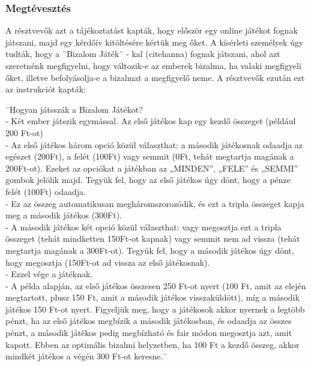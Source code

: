 \subsubsection{Megtévesztés}
A résztvevők azt a tájékoztatást kapták, hogy először egy online játékot fognak játszani, majd egy kérdőív kitöltésére kértük meg őket. A kísérleti személyek úgy tudták, hogy a ¨Bizalom Játék¨ - kal (citehanna) fognak játszani, ahol azt szeretnénk megfigyelni, hogy változik-e az emberek bizalma, ha valaki megfigyeli őket, illetve befolyásolja-e a bizalmat a megfigyelő neme. A résztvevők ezután ezt az instrukciót kapták:
\begin{quoting}[\itshape]
	¨Hogyan játsszák a Bizalom Játékot? \\
	- Két ember játszik egymással. Az első játékos kap egy kezdő összeget (például 200 Ft-ot) \\
	- Az első játékos három opció közül választhat: a második játékosnak odaadja az egészet
	(200Ft), a felét (100Ft) vagy semmit (0Ft, tehát megtartja magának a 200Ft-ot). Ezeket az
	opciókat a játékban az „MINDEN”, „FELE” és „SEMMI” gombok jelölik majd. Tegyük fel, hogy az első játékos úgy dönt, hogy a pénze felét (100Ft) odaadja. \\
	- Ez az összeg automatikusan megháromszorozódik, és ezt a tripla összeget kapja meg a második játékos (300Ft). \\
	- A második játékos két opció közül választhat: vagy megosztja ezt a tripla összeget (tehát mindketten 150Ft-ot kapnak) vagy semmit nem ad vissza (tehát megtartja magának a 300Ft-ot). Tegyük fel, hogy a második játékos úgy dönt, hogy megosztja (150Ft-ot ad vissza az első játékosnak). \\
	- Ezzel vége a játéknak. \\
	- A példa alapján, az első játékos összesen 250 Ft-ot nyert (100 Ft, amit az elején megtartott, 
	plusz 150 Ft, amit a második játékos visszaküldött), míg a második játékos 150 Ft-ot nyert.
	Figyeljük meg, hogy a játékosok akkor nyernek a legtöbb pénzt, ha az első játékos megbízik a második játékosban, és odaadja az összes pénzt, a második játékos pedig megbízható és fair módon megosztja azt, amit kapott. Ebben az optimális bizalmi helyzetben, ha 100 Ft a kezdő összeg, akkor mindkét játékos a végén 300 Ft-ot keresne.¨
\end{quoting}


